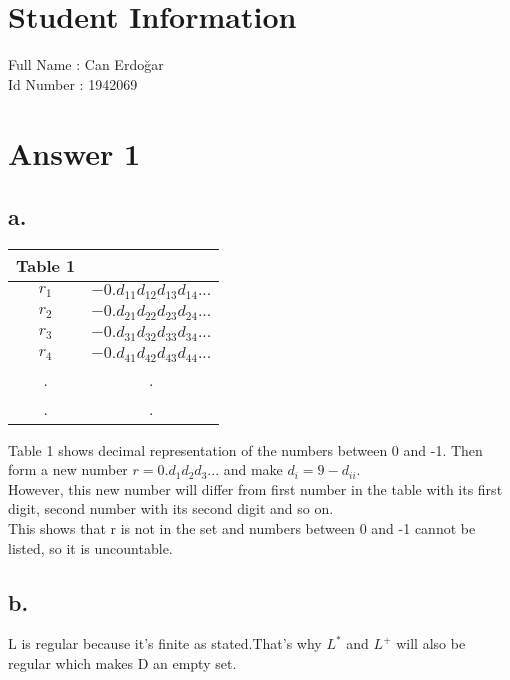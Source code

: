 \documentclass[12pt]{article}
\begin{document}
\section*{Student Information } 
Full Name :  Can Erdoğar \\
Id Number :  1942069 \\

\section*{Answer 1}

\subsection*{a.}
\begin{table}[H]
	\small
	\label{Q1-A}
	\begin{tabular}{|c|c|}	%
	\hline
	Table 1 \\
	\hline 
	$r_1$ & $-0.d_{11}d_{12}d_{13}d_{14}...$ \\			%
	$r_2$ & $-0.d_{21}d_{22}d_{23}d_{24}...$ \\
	$r_3$ & $-0.d_{31}d_{32}d_{33}d_{34}...$ \\
	$r_4$ & $-0.d_{41}d_{42}d_{43}d_{44}...$ \\
	. & . \\
	. & . \\
	\hline 

	\end{tabular}
\end{table}

Table 1 shows decimal representation of the numbers between 0 and -1. Then form a new number $r=0. d_1 d_2 d_3 ...$ and make $d_i= 9 - d_{ii}$.\\
However, this new number will differ from first number in the table with its first digit, second number with its second digit and so on. \\
This shows that r is not in the set and numbers between 0 and -1 cannot be listed, so it is uncountable. 

\subsection*{b.}
L is regular because it's finite as stated.That's why $L^{*}$ and $L^{+}$ will also be regular which makes D an empty set. \\
\end{document}
